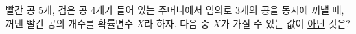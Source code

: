 빨간 공 5개, 검은 공 4개가 들어 있는 주머니에서 임의로 3개의 공을 동시에 꺼낼 때, 꺼낸 빨간 공의 개수를 확률변수 $X$라 하자. 다음 중 $X$가 가질 수 있는 값이 \underline{아닌} 것은?
